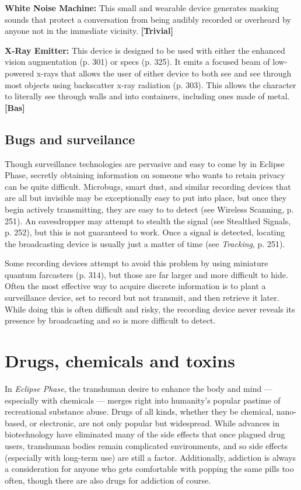 {{\textbf{White Noise Machine:} This small and wearable device generates masking sounds that protect a conversation from being audibly recorded or overheard by anyone not in the immediate vicinity. \textbf{[Trivial]} 

\textbf{X-Ray Emitter:} This device is designed to be used with either the enhanced vision augmentation (p. 301) or specs (p. 325). It emits a focused beam of low-powered x-rays that allows the user of either device to both see and see through most objects using backscatter x-ray radiation (p. 303). This allows the character to literally see through walls and into containers, including ones made of metal. \textbf{[Bas]} 

\subsection{Bugs and surveilance} \label{sec:bugs-surveilance} 

Though surveillance technologies are pervasive and easy to come by in Eclipse Phase, secretly obtaining information on someone who wants to retain privacy can be quite difficult. Microbugs, smart dust, and similar recording devices that are all but invisible may be exceptionally easy to put into place, but once they begin actively transmitting, they are easy to to detect (see Wireless Scanning, p. 251). An eavesdropper may attempt to stealth the signal (see Stealthed Signals, p. 252), but this is not guaranteed to work. Once a signal is detected, locating the broadcasting device is usually just a matter of time (see \textit{Tracking}, p. 251). 

Some recording devices attempt to avoid this problem by using miniature quantum farcasters (p. 314), but those are far larger and more difficult to hide. Often the most effective way to acquire discrete information is to plant a surveillance device, set to record but not transmit, and then retrieve it later. While doing this is often difficult and risky, the recording device never reveals its presence by broadcasting and so is more difficult to detect. 

\section{Drugs, chemicals and toxins} \label{sec:drugs-chemicals-toxins} 

In \emph{Eclipse Phase}, the transhuman desire to enhance the body and mind --- especially with chemicals --- merges right into humanity’s popular pastime of recreational substance abuse. Drugs of all kinds, whether they be chemical, nano-based, or electronic, are not only popular but widespread. While advances in biotechnology have eliminated many of the side effects that once plagued drug users, transhuman bodies remain complicated environments, and so side effects (especially with long-term use) are still a factor. Additionally, addiction is always a consideration for anyone who gets comfortable with popping the same pills too often, though there are also drugs for addiction of course. 

}}
